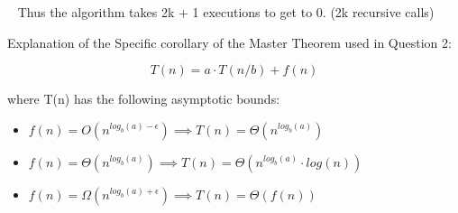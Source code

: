 \documentclass[12pt, letterpaper]{article}
\begin{document}
\begin{enumerate}
    \-\ \newline
    \textnormal{ Thus the algorithm takes 2k + 1 executions to get to 0. (2k recursive calls) }

    \newpage
    
    Explanation of the Specific corollary of the Master Theorem used in Question 2:

    \[ T(n) = a \cdot T(n/b) + f(n) \]

    where T(n) has the following asymptotic bounds:

    \begin{itemize}
        \item \(f(n) = O( n^{log_b(a) - \epsilon} ) \implies T(n) = \Theta(n^{log_b(a)})  \)
        \item \(f(n) = \Theta( n^{log_b(a) }) \implies T(n) = \Theta(n^{log_b(a)} \cdot log(n))  \)
        \item \(f(n) = \Omega( n^{log_b(a) + \epsilon} ) \implies T(n) = \Theta(f(n)) \)
    \end{itemize} 




\end{enumerate}
\end{document}
